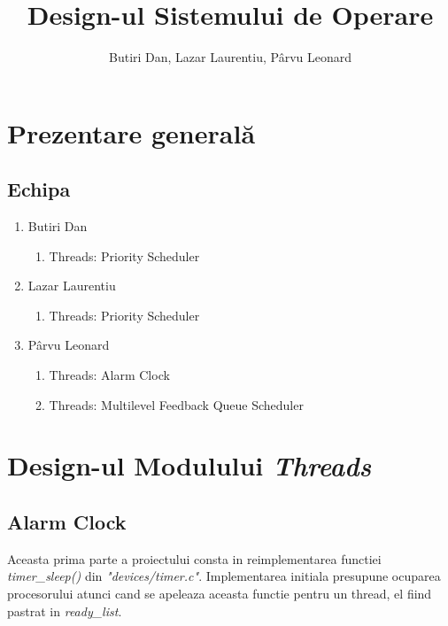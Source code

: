 \documentclass[a4paper,12pt]{report}
\title{Design-ul Sistemului de Operare \OSName{}}
\author{Butiri Dan, Lazar Laurentiu, Pârvu Leonard}
\begin{document}


\maketitle

\chapter{Prezentare generală}

\section{Echipa}

\begin{enumerate}
	\item Butiri Dan
	    \begin{enumerate}
	     \item Threads: Priority Scheduler
	    \end{enumerate}

	\item Lazar Laurentiu
	    \begin{enumerate}
	     \item Threads: Priority Scheduler
	    \end{enumerate}
	    
	\item Pârvu Leonard
	    \begin{enumerate}
	     \item Threads: Alarm Clock
	     \item Threads: Multilevel Feedback Queue Scheduler
	    \end{enumerate}
\end{enumerate}


\chapter{Design-ul Modulului \textit{Threads}}

\section{Alarm Clock}

  Aceasta prima parte a proiectului consta in reimplementarea functiei \textit{timer\_sleep()} din
\textit{"devices/timer.c"}. Implementarea initiala presupune ocuparea procesorului atunci cand se apeleaza 
aceasta functie pentru un thread, el fiind pastrat in \textit{ready\_list}.
\end{document}
